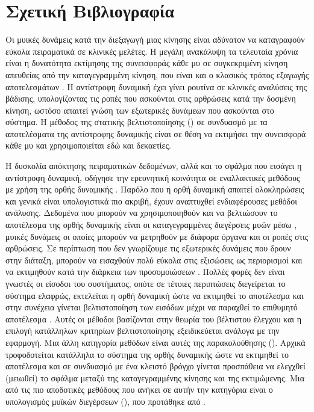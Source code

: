 \section{Σχετική Βιβλιογραφία}

Οι μυικές δυνάμεις κατά την διεξαγωγή μιας κίνησης είναι αδύνατον να καταγραφούν εύκολα πειραματικά σε κλινικές μελέτες. Η μεγάλη ανακάλυψη τα τελευταία χρόνια είναι η δυνατότητα εκτίμησης της συνεισφοράς κάθε μυ σε συγκεκριμένη κίνηση απευθείας από την καταγεγραμμένη κίνηση, που είναι και ο κλασικός τρόπος εξαγωγής αποτελεσμάτων \cite{hamner10, mclean03}. Η αντίστροφη δυναμική έχει γίνει ρουτίνα σε κλινικές αναλύσεις της βάδισης, υπολογίζοντας τις ροπές που ασκούνται στις αρθρώσεις κατά την δοσμένη κίνηση, ωστόσο απαιτεί γνώση των εξωτερικές δυνάμεων που ασκούνται στο σύστημα. Η μέθοδος της στατικής βελτιστοποίησης () σε συνδυασμό με τα αποτελέσματα της αντίστροφης δυναμικής είναι σε θέση να εκτιμήσει την συνεισφορά κάθε μυ \cite{heintz06, erdemir07} και χρησιμοποιείται εδώ και δεκαετίες.

Η δυσκολία απόκτησης πειραματικών δεδομένων, αλλά και το σφάλμα που εισάγει η αντίστροφη δυναμική, οδήγησε την ερευνητική κοινότητα σε εναλλακτικές μεθόδους με χρήση της ορθής δυναμικής \cite{buchanan04}. Παρόλο που η ορθή δυναμική απαιτεί ολοκληρώσεις και γενικά είναι υπολογιστικά πιο ακριβή, έχουν αναπτυχθεί ενδιαφέρουσες μεθόδοι ανάλυσης. Δεδομένα που μπορούν να χρησιμοποιηθούν και να βελτιώσουν το αποτέλεσμα της ορθής δυναμικής είναι οι καταγεγραμμένες διεγέρσεις μυών μέσω , μυικές δυνάμεις οι οποίες μπορούν να μετρηθούν με διάφορα όργανα και οι ροπές στις αρθρώσεις. Σε περίπτωση που δεν γνωρίζουμε τις εξωτερικές δυνάμεις που δρουν στην διάταξη, μπορούν να εισαχθούν πολύ εύκολα στις εξισώσεις ως περιορισμοί και να εκτιμηθούν κατά την διάρκεια των προσομοιώσεων \cite{hamner10, seitha11}. Πολλές φορές δεν είναι γνωστές οι είσοδοι του συστήματος, οπότε σε τέτοιες περιπτώσεις διεγείρεται το σύστημα ελαφρώς, εκτελείται η ορθή δυναμική ώστε να εκτιμηθεί το αποτέλεσμα και στην συνέχεια γίνεται βελτιστοποίηση των εισόδων μέχρι να παραχθεί το επιθυμητό αποτέλεσμα \cite{pandy01}. Αυτές οι μέθοδοι βασίζονται στην θεωρία του βέλτιστου έλεγχου και η επιλογή κατάλληλων κριτηρίων βελτιστοποίησης εξειδικεύεται ανάλογα με την εφαρμογή. Μια άλλη κατηγορία μεθόδων είναι αυτές της παρακολούθησης (). Αρχικά τροφοδοτείται κατάλληλα το σύστημα της ορθής δυναμικής ώστε να εκτιμηθεί το αποτέλεσμα και σε συνδυασμό με ένα κλειστό βρόγχο γίνεται προσπάθεια να ελεγχθεί (μειωθεί) το σφάλμα μεταξύ της καταγεγραμμένης κίνησης και της εκτιμώμενης. Μια από τις πιο αποδοτικές μεθόδους που ανήκει σε αυτήν την κατηγόρια είναι ο υπολογισμός μυϊκών διεγέρσεων (), που προτάθηκε από \cite{thelen06}.

